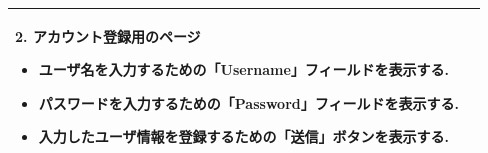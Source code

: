 \documentclass[dvipdfmx]{jsarticle}
\begin{document}
\begin{table}[H]
\begin{tabular}{|l|l|}
\begin{minipage}{140mm}
\begin{itemize}
                \end{itemize}
                2. アカウント登録用のページ
                \begin{itemize}
                    \item ユーザ名を入力するための「Username」フィールドを表示する.
                    \item パスワードを入力するための「Password」フィールドを表示する.
                    \item 入力したユーザ情報を登録するための「送信」ボタンを表示する. 
                \end{itemize}
                \vspace{4truept}
            \end{minipage}
            
            \\ \hline
        \end{tabular}
    \end{table}

    \newpage
\end{document}
